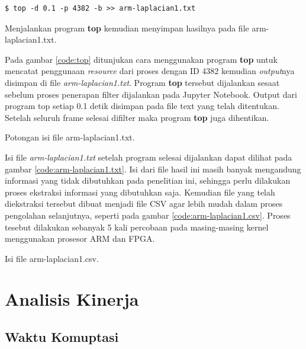 \begin{afigure}
    \begin{lstlisting}[frame=single, style=shell] 
    $ top -d 0.1 -p 4382 -b >> arm-laplacian1.txt    
    \end{lstlisting}
    \caption{Menjalankan program \textbf{top} kemudian menyimpan hasilnya pada file arm-laplacian1.txt.}
    \label{code:top}
\end{afigure}

Pada gambar \ref{code:top} ditunjukan cara menggunakan program \textbf{top} untuk mencatat penggunaan \textit{resource} dari proses dengan ID 4382 kemudian \textit{output}nya disimpan di file \textit{arm-laplacian1.txt}. Program \textbf{top} tersebut dijalankan sesaat sebelum proses penerapan filter dijalankan pada Jupyter Notebook. Output dari program top setiap 0.1 detik disimpan pada file text yang telah ditentukan. Setelah seluruh frame selesai difilter maka program \textbf{top} juga dihentikan.

\begin{afigure}
    
    \caption{Potongan isi file arm-laplacian1.txt.}
    \label{code:arm-laplacian1.txt}
\end{afigure}

Isi file \textit{arm-laplacian1.txt} setelah program selesai dijalankan dapat dilihat pada gambar \ref{code:arm-laplacian1.txt}. Isi dari file hasil ini masih banyak mengandung informasi yang tidak dibutuhkan pada penelitian ini, sehingga perlu dilakukan proses ekstraksi informasi yang dibutuhkan saja. Kemudian file yang telah diekstraksi tersebut dibuat menjadi file CSV agar lebih mudah dalam proses pengolahan selanjutnya, seperti pada gambar \ref{code:arm-laplacian1.csv}. Proses tesebut dilakukan sebanyak 5 kali percobaan pada masing-masing kernel menggunakan prosesor ARM dan FPGA.

\begin{afigure}
    
    \caption{Isi file arm-laplacian1.csv.}
    \label{code:arm-laplacian1.csv}
\end{afigure}


\section{Analisis Kinerja}
\subsection{Waktu Komuptasi}

